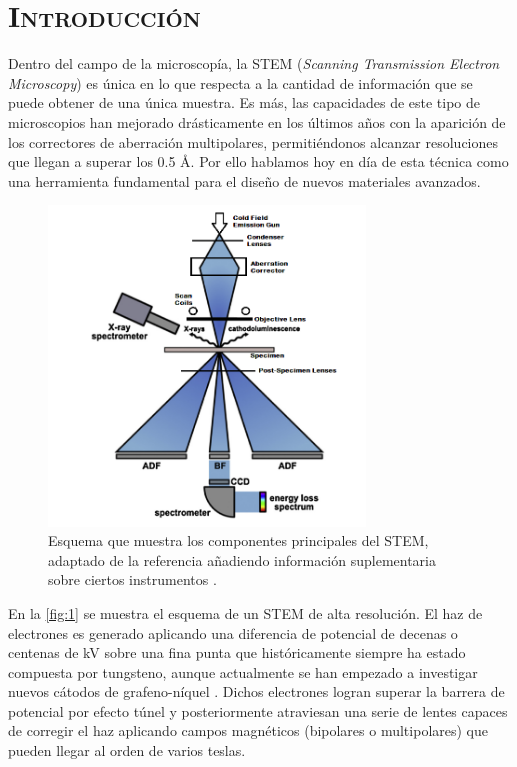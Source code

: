 \section*{\centering\scshape\Huge Introducción}
 \normalsize

Dentro del campo de la microscopía, la STEM (\textit{Scanning Transmission Electron Microscopy}) es única en lo que respecta a la cantidad de información que se puede obtener de una única muestra. Es más, las capacidades de este tipo de microscopios han mejorado drásticamente en los últimos años con la aparición de los correctores de aberración multipolares, permitiéndonos alcanzar resoluciones que llegan a superar los 0.5 Å. Por ello hablamos hoy en día de esta técnica como una herramienta fundamental para el diseño de nuevos materiales avanzados.\\

\begin{figure}[h!]
    \centering
    \includegraphics[width=0.75\textwidth]{fig/Fig1.png}
    \caption{Esquema que muestra los componentes principales del STEM, adaptado de la referencia \cite{foto_intro} añadiendo información suplementaria sobre ciertos instrumentos \cite{maria}.}
    \label{fig:1}
\end{figure}

En la \autoref{fig:1} se muestra el esquema de un STEM de alta resolución. El haz de electrones es generado aplicando una diferencia de potencial de decenas o centenas de kV sobre una fina punta que históricamente siempre ha estado compuesta por tungsteno, aunque actualmente se han empezado a investigar nuevos cátodos de grafeno-níquel \cite{e_gun}. Dichos electrones logran superar la barrera de potencial por efecto túnel y posteriormente atraviesan una serie de lentes capaces de corregir el haz aplicando campos magnéticos (bipolares o multipolares) que pueden llegar al orden de varios teslas.\\

